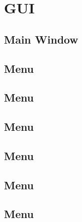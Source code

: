 \chapter{GUI}
\label{sec:gui}

\section{Main Window}

\section{ Menu}

\section{ Menu}

\section{ Menu}

\section{ Menu}

\section{ Menu}

\section{ Menu}